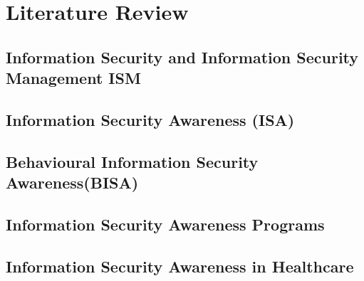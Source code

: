 \chapter{Literature Review}
\label{c:literatur}




\section{Information Security and Information Security Management ISM}
\label{c:literatur:summaries:Information Security}


\section{Information Security Awareness (ISA)}
\label{c:literatur:summaries:info-sec-awa}


\section{Behavioural Information Security Awareness(BISA)}
\label{c:literatur:summaries:behav-info-sec-awa}


\section{Information Security Awareness Programs }
\label{c:literatur:summaries:info-sec-awa-prog}


\section{Information Security Awareness in Healthcare}
\label{c:literatur:summaries:info-sec-awa-helth}

%